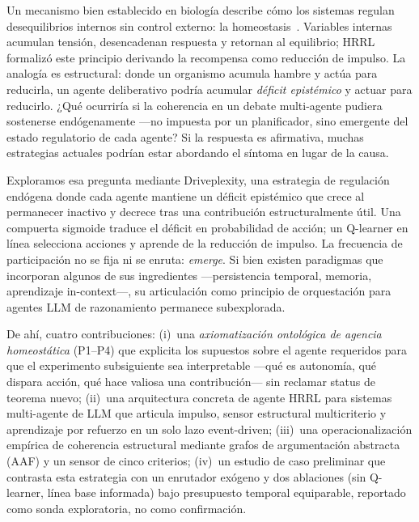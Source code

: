 \documentclass{llncs}
\begin{document}
Un mecanismo bien establecido en biolog\'ia describe c\'omo los sistemas
regulan desequilibrios internos sin control externo: la
homeostasis~\parencite{sterling1988allostasis}. Variables internas
acumulan tensi\'on, desencadenan respuesta y retornan al equilibrio;
HRRL~\parencite{keramati2014homeostatic} formaliz\'o este principio
derivando la recompensa como reducci\'on de impulso. La analog\'ia es
estructural: donde un organismo acumula hambre y act\'ua para reducirla,
un agente deliberativo podr\'ia acumular \emph{d\'eficit epist\'emico} y
actuar para reducirlo. ¿Qu\'e ocurrir\'ia si la coherencia en un debate
multi-agente pudiera sostenerse end\'ogenamente ---no impuesta por un
planificador, sino emergente del estado regulatorio de cada agente?
Si la respuesta es afirmativa, muchas estrategias actuales podr\'ian
estar abordando el s\'intoma en lugar de la causa.

Exploramos esa pregunta mediante Driveplexity, una estrategia de
regulaci\'on end\'ogena donde cada agente mantiene un d\'eficit epist\'emico
que crece al permanecer inactivo y decrece tras una contribuci\'on
estructuralmente \'util. Una compuerta sigmoide traduce el d\'eficit en
probabilidad de acci\'on; un Q-learner en l\'inea selecciona acciones y
aprende de la reducci\'on de impulso. La frecuencia de participaci\'on no
se fija ni se enruta: \emph{emerge}. Si bien existen paradigmas que
incorporan algunos de sus ingredientes ---persistencia temporal, memoria,
aprendizaje in-context---, su articulaci\'on como principio de
orquestaci\'on para agentes LLM de razonamiento permanece subexplorada.

De ah\'i, cuatro contribuciones: (i)~una \emph{axiomatizaci\'on
ontol\'ogica de agencia homeost\'atica} (P1--P4) que explicita los
supuestos sobre el agente requeridos para que el experimento
subsiguiente sea interpretable ---qu\'e es autonom\'ia, qu\'e dispara
acci\'on, qu\'e hace valiosa una contribuci\'on--- sin reclamar
status de teorema nuevo; (ii)~una arquitectura concreta de agente HRRL
para sistemas multi-agente de LLM que articula impulso, sensor
estructural multicriterio y aprendizaje por refuerzo en un solo lazo
event-driven; (iii)~una operacionalizaci\'on emp\'irica de coherencia
estructural mediante grafos de argumentaci\'on abstracta (AAF) y un
sensor de cinco criterios; (iv)~un estudio de caso preliminar que
contrasta esta estrategia con un enrutador ex\'ogeno y dos ablaciones
(sin Q-learner, l\'inea base informada) bajo presupuesto temporal
equiparable, reportado como sonda exploratoria, no como confirmaci\'on.
\end{document}

